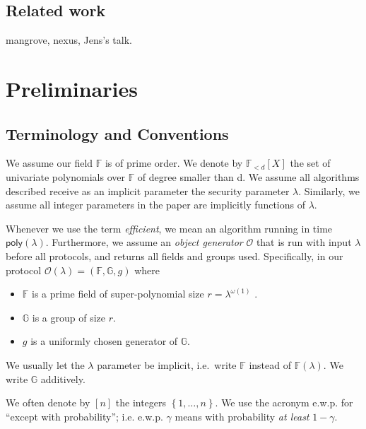 \documentclass[11pt]{article} %
\newcommand{\G}{\ensuremath{{\mathbb G}}\xspace}
\newcommand{\F}{\ensuremath{\mathbb F}\xspace}
\newcommand{\defeq}{:=}
\newcommand{\set}[1]{\ensuremath{\left\{#1\right\}}\xspace}
\newcommand{\polysofdeg}[1]{\ensuremath{\F_{< #1}[X]}\xspace}
\newcommand{\obgen}{\ensuremath{\mathcal O}\xspace}
\newcommand{\poly}{\ensuremath{\mathsf{poly(\lambda)}}\xspace}
\begin{document}
\subsection{Related work}
mangrove, nexus, Jens's talk.



\section{Preliminaries}
\subsection{Terminology and Conventions}\label{sec:terminology}
We assume our field \F is of prime order.
We denote by \polysofdeg{d} the set of univariate polynomials over \F of degree smaller than d. 
We assume all algorithms described receive as an implicit parameter the security parameter $\lambda$.
Similarly, we assume all integer parameters in the paper are implicitly functions of $\lambda$.

Whenever we use the term \emph{efficient}, we mean an algorithm running in time \poly. Furthermore,
we assume an \emph{object generator} \obgen that is run with input $\lambda$ before all protocols, and returns all fields and groups used. Specifically, in our protocol $\obgen(\lambda) = (\F, \G,g)$ where
\begin{itemize}
\item \F is a prime field of super-polynomial size $r = \lambda^{\omega(1)}$
.
\item $\G$ is a group of size $r$.
\item $g$ is a uniformly chosen generator of \G.
\end{itemize}
We usually let the $\lambda$ parameter be implicit, i.e.\ write \F instead of $\F(\lambda)$.
We write \G additively.

We often denote by $[n]$ the integers \set{1,\ldots,n}.
We use the acronym e.w.p. for ``except with probability''; i.e. e.w.p. $\gamma$ means with probability \emph{at least} $1-\gamma$.
\end{document}
